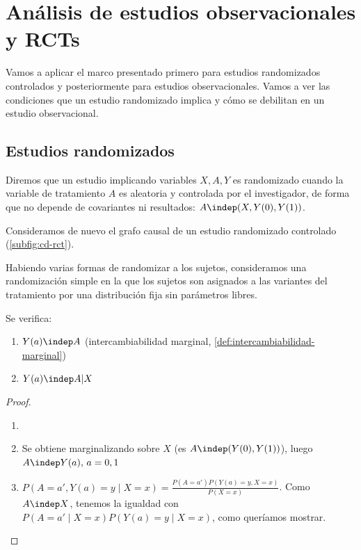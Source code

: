 \section{Análisis de estudios observacionales y RCTs}
Vamos a aplicar el marco presentado primero para estudios randomizados controlados y
posteriormente para estudios observacionales.
Vamos a ver las condiciones que un estudio randomizado implica y cómo se debilitan
en un estudio observacional.

\subsection{Estudios randomizados}
\begin{definicion}[Randomización]
    Diremos que un estudio implicando variables $X, A, Y$ es randomizado cuando la
    variable de tratamiento $A$ es aleatoria y controlada por el investigador, de forma que
    no depende de covariantes ni resultados:
    $A \indep (X, Y(0), Y(1))$.

\end{definicion}

Consideramos de nuevo el grafo causal de un estudio randomizado controlado
(\autoref{subfig:cd-rct}).

Habiendo varias formas de randomizar a los sujetos\footnotemark, consideramos una
randomización simple en la que los sujetos son asignados a las variantes del tratamiento
por una distribución fija sin parámetros libres.

\begin{proposicion}
    Se verifica:
    \begin{enumerate}
        \item $Y(a) \indep A$ (intercambiabilidad marginal, \autoref{def:intercambiabilidad-marginal})
        \item $Y(a) \indep A | X$
    \end{enumerate}
\end{proposicion}

\begin{proof}
    \begin{enumerate}
        \item[]
        \item Se obtiene marginalizando sobre $X$ (es $A \indep (Y(0), Y(1))$), luego
              $A \indep Y(a), \, a = 0, 1$
        \item $P(A = a', Y(a) = y \mid X = x) = \frac{P(A = a')P(Y(a) = y, X = x)}{P(X = x)}$.
              Como $A \indep X$, tenemos la igualdad con
              $P(A = a' \mid X = x)P(Y(a) = y \mid X = x)$, como queríamos mostrar.
    \end{enumerate}
\end{proof}



